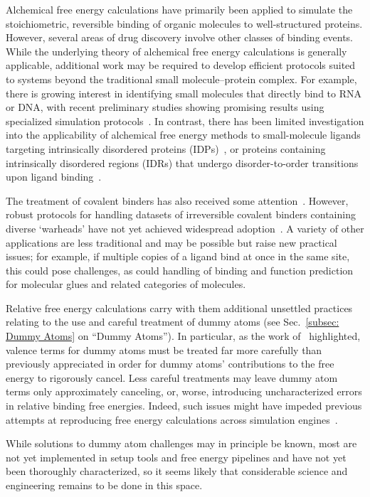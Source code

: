 \documentclass[9pt,bestpractices]{livecoms}
\begin{document}
Alchemical free energy calculations have primarily been applied to simulate the stoichiometric, reversible binding of organic molecules to well-structured proteins. However, several areas of drug discovery involve other classes of binding events. While the underlying theory of alchemical free energy calculations is generally applicable, additional work may be required to develop efficient protocols suited to systems beyond the traditional small molecule–protein complex. For example, there is growing interest in identifying small molecules that directly bind to RNA or DNA, with recent preliminary studies showing promising results using specialized simulation protocols~\cite{Abramyan2025,Rasouli2024}. In contrast, there has been limited investigation into the applicability of alchemical free energy methods to small-molecule ligands targeting intrinsically disordered proteins (IDPs)~\cite{Papadourakis2024}, or proteins containing intrinsically disordered regions (IDRs) that undergo disorder-to-order transitions upon ligand binding~\cite{MendozaMartinez2022, kalpokas2025accurate}.

The treatment of covalent binders has also received some attention~\cite{luo2021,zhang2019}. However, robust protocols for handling datasets of irreversible covalent binders containing diverse ‘warheads’ have not yet achieved widespread adoption~\cite{Yu2019}. A variety of other applications are less traditional and may be possible but raise new practical issues; for example, if multiple copies of a ligand bind at once in the same site, this could pose challenges, as could handling of binding and function prediction for molecular glues and related categories of molecules. 

Relative free energy calculations carry with them additional unsettled practices relating to the use and careful treatment of dummy atoms (see Sec.~\ref{subsec: Dummy Atoms} on ``Dummy Atoms''). In particular, as the work of~\cite{Fleck_2021} highlighted, valence terms for dummy atoms must be treated far more carefully than previously appreciated in order for dummy atoms' contributions to the free energy to rigorously cancel. Less careful treatments may leave dummy atom terms only approximately canceling, or, worse, introducing uncharacterized errors in relative binding free energies. Indeed, such issues might have impeded previous attempts at reproducing free energy calculations across simulation engines~\cite{loeffler2018reproducibility}. 

While solutions to dummy atom challenges may in principle be known, most are not yet implemented in setup tools and free energy pipelines and have not yet been thoroughly characterized, so it seems likely that considerable science and engineering remains to be done in this space. 
\end{document}
